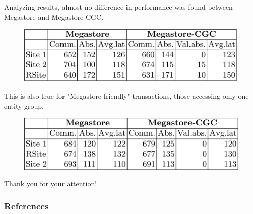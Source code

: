 \documentclass{beamer}
\begin{document}
\begin{frame}
    Analyzing results,  almost no difference in performance was found between Megastore and Megastore-CGC.
    \begin{figure}
        \includegraphics[width=\textwidth]{img/perf1.png}
        \end{figure}
    
    This is also true for "Megastore-friendly" transactions, those accessing 
    only one entity group.
    \begin{figure}
        \includegraphics[width=\textwidth]{img/perf2.png}
    \end{figure}
\end{frame}

\begin{frame}
    \huge
    Thank you for your attention!
\end{frame}
\begin{frame}[allowframebreaks]
      \nocite{*}
        \frametitle{References}
        
        
\end{frame}
\end{document}
